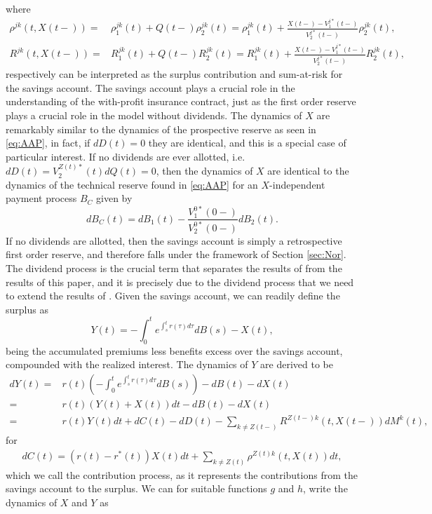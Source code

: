 \documentclass[12pt]{article}
\theoremstyle{my_thm}
\begin{document}
where
\begin{align*}
\rho^{jk}(t,X(t-))=&\rho_1^{jk}(t)+Q(t-)\rho_2^{jk}(t)=\rho_1^{jk}(t)+\frac{X(t-)-V_1^{j*}(t-)}{V_2^{j*}(t-)}\rho_2^{jk}(t),
\\
R^{jk}(t,X(t-))=&R_1^{jk}(t)+Q(t-)R_2^{jk}(t)=R_1^{jk}(t)+\frac{X(t-)-V_1^{j*}(t-)}{V_2^{j*}(t-)}R_2^{jk}(t),
\end{align*}
respectively can be interpreted as the surplus contribution and sum-at-risk for the savings account. The savings account plays a crucial role in the understanding of the with-profit insurance contract, just as the first order reserve plays a crucial role in the model without dividends. The dynamics of $X$ are remarkably similar to the dynamics of the prospective reserve as seen in \eqref{eq:AAP}, in fact, if $dD(t)=0$ they are identical, and this is a special case of particular interest. If no dividends are ever allotted, i.e. $dD(t)=V_2^{Z(t)*}(t)dQ(t)=0$, then the dynamics of $X$ are identical to the dynamics of the technical reserve found in \eqref{eq:AAP} for an $X$-independent payment process $B_C$ given  by
$$
dB_C(t)=dB_1(t)-\frac{V_1^{0*}(0-)}{V_2^{0*}(0-)}dB_2(t).
$$
If no dividends are allotted, then the savings account is simply a retrospective first order reserve, and therefore falls under the framework of Section \ref{sec:Nor}. The dividend process is the crucial term that separates the results of \citet{Norberg} from the results of this paper, and it is precisely due to the dividend process that we need to extend the results of \citet{Norberg}. Given the savings account, we can readily define the surplus as
$$
Y(t)= - \int_0^t e^{\int_s^t r(\tau) d\tau} dB(s)-X(t),
$$
being the accumulated premiums less benefits excess over the savings account, compounded with the realized interest. The dynamics of $Y$ are derived to be
\begin{align}
dY(t)=&
 r(t) \left( -\int_0^t e^{\int_s^t r(\tau) d\tau} dB(s) \right) - dB(t) -dX(t) \nonumber
\\
=&
r(t) \left(Y(t) + X(t) \right)dt - dB(t) -dX(t) \nonumber \\
=& r(t) Y(t) dt + dC(t)-dD(t)-
\sum_{k \neq Z(t-)}  R^{Z(t-)k}(t,X(t-)) dM^k(t), \label{eq:AAC}
\end{align}
for 
\begin{gather*}
dC(t)=(r(t)-r^*(t))X(t)dt+\sum_{k\neq Z(t)} \rho^{Z(t)k}(t,X(t)) dt,
\end{gather*}
which we call the contribution process, as it represents the contributions from the savings account to the surplus.  We can for suitable functions $g$ and $h$, write the dynamics of $X$ and $Y$ as
\end{document}
